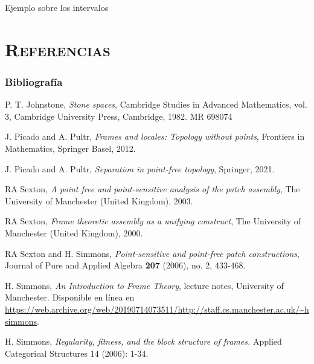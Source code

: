 \documentclass[compress,12pt]{beamer}
\begin{document}
\begin{frame}{Ejemplo sobre los intervalos}

\end{frame}
\End

\section*{\textsc{Referencias}}
\begin{frame}[allowframebreaks]
\frametitle{Bibliografía}
\begin{thebibliography}{20}

 P. T. Johnstone, \textit{Stone spaces}, Cambridge Studies in Advanced Mathematics, vol. 3, Cambridge University Press, Cambridge, 1982. MR 698074



 J. Picado and A. Pultr, \textit{Frames and locales: Topology without points}, Frontiers in Mathematics, Springer Basel, 2012.

 J. Picado and A. Pultr, \textit{Separation in point-free topology}, Springer, 2021.

 RA Sexton, \textit{A point free and point-sensitive analysis of the patch assembly}, The University of Manchester (United Kingdom), 2003.

 RA Sexton, \textit{Frame theoretic assembly as a unifying construct}, The University of Manchester (United Kingdom), 2000.

 RA Sexton and H. Simmons, \textit{Point-sensitive and point-free patch constructions}, Journal of Pure and Applied Algebra \textbf{207} (2006), no. 2, 433-468.

 H. Simmons, \textit{An Introduction to Frame Theory}, lecture notes, University of Manchester. Disponible en línea en \url{https://web.archive.org/web/20190714073511/http://staff.cs.manchester.ac.uk/~hsimmons}.

 H. Simmons, \textit{Regularity, fitness, and the block structure of frames.} Applied Categorical Structures 14 (2006): 1-34.


\end{thebibliography}
\end{frame}
\end{document}
